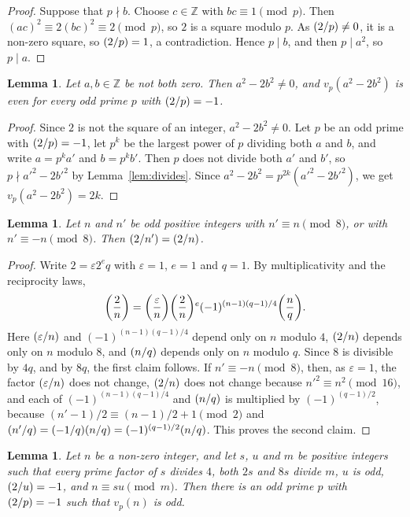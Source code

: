 \documentclass[11pt]{article}
\newtheorem{lemma}[theorem]{Lemma}
\newcommand{\Z}{\mathbb{Z}}
\newcommand{\leg}[2]{\mathchoice{\biggl(\dfrac{#1}{#2}\biggr)}{(#1/#2)}{(#1/#2)}{(#1/#2)}}
\begin{document}
\begin{proof}
Suppose that $p\nmid b$. Choose $c\in\Z$ with $bc\equiv1\pmod p$. Then $(ac)^2\equiv2(bc)^2\equiv2\pmod p$, so $2$ is a square modulo $p$. As $\leg{2}{p}\neq0$, it is a non-zero square, so $\leg{2}{p}=1$, a contradiction. Hence $p\mid b$, and then $p\mid a^2$, so $p\mid a$.
\end{proof}

\begin{lemma}\label{lem:even}
Let $a,b\in\Z$ be not both zero. Then $a^2-2b^2\neq0$, and $v_p(a^2-2b^2)$ is even for every odd prime $p$ with $\leg{2}{p}=-1$.
\end{lemma}

\begin{proof}
Since $2$ is not the square of an integer, $a^2-2b^2\neq0$. Let $p$ be an odd prime with $\leg{2}{p}=-1$, let $p^k$ be the largest power of $p$ dividing both $a$ and $b$, and write $a=p^ka'$ and $b=p^kb'$. Then $p$ does not divide both $a'$ and $b'$, so $p\nmid a'^2-2b'^2$ by Lemma~\ref{lem:divides}. Since $a^2-2b^2=p^{2k}(a'^2-2b'^2)$, we get $v_p(a^2-2b^2)=2k$.
\end{proof}

\begin{lemma}\label{lem:period}
Let $n$ and $n'$ be odd positive integers with $n'\equiv n\pmod{8}$, or with $n'\equiv-n\pmod{8}$. Then $\leg{2}{n'}=\leg{2}{n}$.
\end{lemma}

\begin{proof}
Write $2=\varepsilon2^eq$ with $\varepsilon=1$, $e=1$ and $q=1$. By multiplicativity and the reciprocity laws,
\[
\leg{2}{n}=\leg{\varepsilon}{n}\leg{2}{n}^e(-1)^{(n-1)(q-1)/4}\leg{n}{q}.
\]
Here $\leg{\varepsilon}{n}$ and $(-1)^{(n-1)(q-1)/4}$ depend only on $n$ modulo $4$, $\leg{2}{n}$ depends only on $n$ modulo $8$, and $\leg{n}{q}$ depends only on $n$ modulo $q$. Since $8$ is divisible by $4q$, and by $8q$, the first claim follows. If $n'\equiv-n\pmod{8}$, then, as $\varepsilon=1$, the factor $\leg{\varepsilon}{n}$ does not change, $\leg{2}{n}$ does not change because $n'^2\equiv n^2\pmod{16}$, and each of $(-1)^{(n-1)(q-1)/4}$ and $\leg{n}{q}$ is multiplied by $(-1)^{(q-1)/2}$, because $(n'-1)/2\equiv(n-1)/2+1\pmod 2$ and $\leg{n'}{q}=\leg{-1}{q}\leg{n}{q}=(-1)^{(q-1)/2}\leg{n}{q}$. This proves the second claim.
\end{proof}

\begin{lemma}\label{lem:odd}
Let $n$ be a non-zero integer, and let $s$, $u$ and $m$ be positive integers such that every prime factor of $s$ divides $4$, both $2s$ and $8s$ divide $m$, $u$ is odd, $\leg{2}{u}=-1$, and $n\equiv su\pmod m$. Then there is an odd prime $p$ with $\leg{2}{p}=-1$ such that $v_p(n)$ is odd.
\end{lemma}
\end{document}
